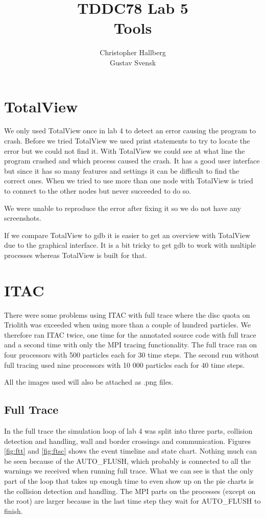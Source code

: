 \documentclass[a4paper, 12pt]{article}
\begin{document}
\title{TDDC78 Lab 5\\
        Tools }
\author{Christopher Hallberg \\
        Gustav Svensk}
\maketitle

\thispagestyle{empty}

\newpage
\setcounter{page}{1}
\tableofcontents
\newpage

\section{TotalView}
We only used TotalView once in lab 4 to detect an error causing the program to
crash. Before we tried TotalView we used print statements to try to locate the
error but we could not find it. With TotalView we could see at what line the
program crashed and which process caused the crash. It has a good user interface
but since it has so many features and settings it can be difficult to find the
correct ones. When we tried to use more than one node with TotalView is tried to
connect to the other nodes but never succeeded to do so.

We were unable to reproduce the error after fixing it so we do not have any
screenshots.

If we compare TotalView to gdb it is easier to get an overview with TotalView
due to the graphical interface. It is a bit tricky to get gdb to work with
multiple processes whereas TotalView is built for that.

\section{ITAC}
There were some problems using ITAC with full trace where the disc quota on Triolith
was exceeded when using more than a couple of hundred particles. We therefore
ran ITAC twice, one time for the annotated source code with full trace and a
second time with only the MPI tracing functionality. The full trace ran on
four processors with 500 particles each for 30 time steps. The second run without
full tracing used nine processors with 10 000 particles each for 40 time steps.

All the images used will also be attached as .png files.

\subsection{Full Trace}
In the full trace the simulation loop of lab 4 was split into three parts,
collision detection and handling, wall and border crossings and communication. 
Figures \ref{fig:ftt} and \ref{fig:ftsc} shows the event timeline and state
chart. Nothing much can be seen because of the AUTO\_FLUSH, which probably is
connected to all the warnings we received when running full trace. What we can
see is that the only part of the loop that takes up enough time to even show up
on the pie charts is the collision detection and handling. The MPI parts on the
processes (except on the root) are larger because in the last time step they wait for
AUTO\_FLUSH to finish. 
\end{document}

